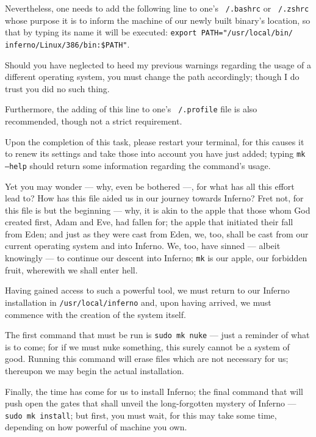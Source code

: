 \documentclass[a5paper,twoside,12pt]{report}
\begin{document}
Nevertheless, one needs to add the following line to one's \texttt{~/.bashrc} or \texttt{~/.zshrc} whose purpose it is to inform the machine of our newly built binary's location, so that by typing its name it will be executed: \texttt{export PATH="/usr/local/bin/\\inferno/Linux/386/bin:\$PATH"}.

Should you have neglected to heed my previous warnings regarding the usage of a different operating system, you must change the path accordingly; though I do trust you did no such thing.

Furthermore, the adding of this line to one's \texttt{~/.profile} file is also recommended, though not a strict requirement.

Upon the completion of this task, please restart your terminal, for this causes it to renew its settings and take those into account you have just added; typing \texttt{mk --help} should return some information regarding the command's usage.

Yet you may wonder — why, even be bothered —, for what has all this effort lead to? How has this file aided us in our journey towards Inferno? Fret not, for this file is but the beginning — why, it is akin to the apple that those whom God created first, Adam and Eve, had fallen for; the apple that initiated their fall from Eden; and just as they were cast from Eden, we, too, shall be cast from our current operating system and into Inferno. We, too, have sinned — albeit knowingly — to continue our descent into Inferno; \texttt{mk} is our apple, our forbidden fruit, wherewith we shall enter hell.

Having gained access to such a powerful tool, we must return to our Inferno installation in \texttt{/usr/local/inferno} and, upon having arrived, we must commence with the creation of the system itself.

The first command that must be run is \texttt{sudo mk nuke} — just a reminder of what is to come; for if we must nuke something, this surely cannot be a system of good. Running this command will erase files which are not necessary for us; thereupon we may begin the actual installation.

Finally, the time has come for us to install Inferno; the final command that will push open the gates that shall unveil the long-forgotten mystery of Inferno — \texttt{sudo mk install}; but first, you must wait, for this may take some time, depending on how powerful of machine you own.
\newpage
\end{document}
